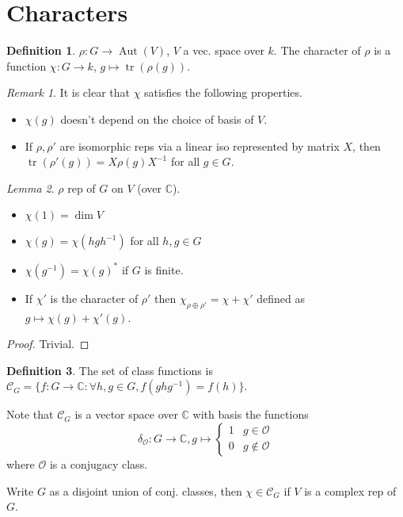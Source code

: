 \documentclass{article}
\theoremstyle{definition}
\newtheorem{defn}{Definition}[section]
\theoremstyle{remark}
\newtheorem{rem}{Remark}
\newtheorem{lem}[defn]{Lemma}
\theoremstyle{plain}
\newcommand{\CC}{\mathbb{C}}
\begin{document}
\section{Characters}
\begin{defn}
    $\rho:G\to\operatorname{Aut}(V)$, $V$ a vec. space over $k$. The character of $\rho$ is a function $\chi:G\to k$, $g\mapsto\operatorname{tr}(\rho(g))$.
\end{defn}
\begin{rem}
    It is clear that $\chi$ satisfies the following properties.
    \begin{itemize}
        \item $\chi(g)$ doesn't depend on the choice of basis of $V$.
        \item If $\rho,\rho'$ are isomorphic reps via a linear iso represented by matrix $X$, then $\operatorname{tr}(\rho'(g))=X\rho(g) X^{-1}$ for all $g\in G$.
    \end{itemize}
\end{rem}
\begin{lem}
    $\rho$ rep of $G$ on $V$ (over $\CC$).
    \begin{itemize}
        \item $\chi(1)=\dim V$
        \item $\chi(g)=\chi(hgh^{-1})$ for all $h,g\in G$
        \item $\chi(g^{-1})=\chi(g)^\ast$ if $G$ is finite.
        \item If $\chi'$ is the character of $\rho'$ then $\chi_{\rho\oplus\rho'}=\chi+\chi'$ defined as $g\mapsto\chi(g)+\chi'(g)$.
    \end{itemize}
\end{lem}
\begin{proof}
    Trivial.
\end{proof}
\begin{defn}
    The set of class functions is $\mathcal{C}_G=\{f:G\to\CC:\forall h,g\in G, f(ghg^{-1})=f(h)\}$.
\end{defn}
Note that $\mathcal{C}_G$ is a vector space over $\CC$ with basis the functions \[\delta_{\mathcal{O}}:G\to\CC,g\mapsto \begin{cases}1&g\in\mathcal{O}\\ 0&g\not\in\mathcal{O}\end{cases}\]
where $\mathcal{O}$ is a conjugacy class.

Write $G$ as a disjoint union of conj. classes, then $\chi\in\mathcal{C}_G$ if $V$ is a complex rep of $G$.
\end{document}
